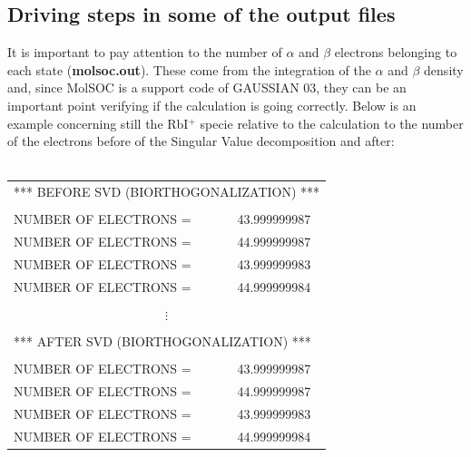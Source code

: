 \documentclass[a4paper,12pt]{article}
\begin{document}
\subsection{Driving steps in some of the output files}
It is important to pay attention to the number of $\alpha$ and $\beta$ 
electrons belonging to each state ({\bf molsoc.out}). 
These come from the integration of the $\alpha$ and $\beta$ 
density and, since {\sf MolSOC} is a support code of {\sf GAUSSIAN 03}, they can be an important 
point verifying if the calculation is going correctly. Below is an example concerning still 
the RbI$^+$ specie relative to the calculation to the number of the electrons before 
of the Singular Value decomposition and after: \\ \\
\begin{tabular}{lll}
\multicolumn{3}{l}{*** BEFORE SVD (BIORTHOGONALIZATION) *** } \\
                       &                     &                \\
NUMBER OF ELECTRONS =  &                     &   43.999999987 \\
NUMBER OF ELECTRONS =  &                     &   44.999999987 \\
NUMBER OF ELECTRONS =  &                     &   43.999999983 \\
NUMBER OF ELECTRONS =  &                     &   44.999999984 \\
                       &                     &                \\
\multicolumn{3}{c}{$\vdots$}                                 \\
                       &                     &                \\
\multicolumn{3}{l}{*** AFTER SVD (BIORTHOGONALIZATION)  ***}  \\
                       &                     &                \\
NUMBER OF ELECTRONS =  &                     &   43.999999987 \\
NUMBER OF ELECTRONS =  &                     &   44.999999987 \\
NUMBER OF ELECTRONS =  &                     &   43.999999983 \\
NUMBER OF ELECTRONS =  &                     &   44.999999984 \\
\end{tabular} \\ \\ \\
\end{document}
